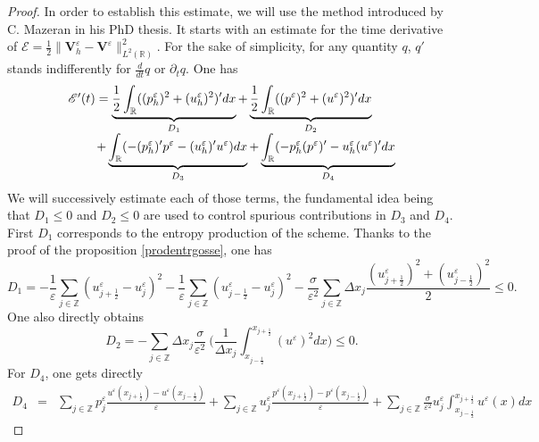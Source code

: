 \documentclass[a4paper,french,english,10pt]{article}
\newcommand\eps{\varepsilon}
\begin{document}
\begin{proof}
In order to establish this estimate, we will use the method introduced by C.
Mazeran \cite{Mazeran} in his PhD thesis.
It  starts with an estimate for the time derivative of
$\mathscr{E}=\frac12 \|\mathbf V_h^\eps - \mathbf V^\eps  \|^2_{L^2(\mathbb{R})}$.
For the sake of simplicity, for any quantity $q$,   $q'$ stands indifferently for  $\frac{d}{dt}q $ or $\partial_t q $. One has 
\begin{equation*}\label{esti}
\begin{array}{l}
\mathscr{E}'(t) = \underbrace{\frac12 
\int_{\mathbb{R}}((p_{h}^{\eps})^2+(u_{h}^{\eps})^2)'dx}_{D_1}+
\underbrace{\frac12 
\int_{\mathbb{R}}((p^{\eps})^2+(u^{\eps})^2)'dx}_{D_2} \\
\hspace{0.8cm}
+ \underbrace{\int_{\mathbb{R}}
(-(p_{h}^{\eps})'p^\eps-(u_{h}^{\eps})'u^\eps)dx}_{D_3} + \underbrace{\int_{\mathbb{R}}
(-p_{h}^{\eps}(p^{\eps})'-u_{h}^{\eps}(u^{\eps})'dx}_{D_4}
\end{array}
\end{equation*}
We will successively estimate each of those terms,
the fundamental idea being that
$D_1\leq 0$ and $D_2\leq 0$ are used to control 
spurious contributions in $D_3$ and $D_4$.
First $D_1$ corresponds to the
entropy production of the scheme. Thanks to the proof of
the proposition \ref{prodentrgosse},
one has
\begin{equation*}
 D_1 = -\frac{1}{\eps}\sum_{j\in \mathbb{Z}}
(u_{j+\frac12 }^{\eps}-u^{\eps}_j)^2 -\frac{1}{\eps} \sum_{j\in
\mathbb{Z}}(u_{j-\frac12 }^{\eps}-u^{\eps}_j)^2-
\frac{\sigma}{\eps^2}\sum_{j\in \mathbb{Z}} \Delta x_{j}
\frac{(u_{j+\frac12 }^{\eps})^2+(u_{j-\frac12 }^{\eps})^2}{2}\leq 0.
\end{equation*}
One also directly obtains
\begin{equation*}
 D_2 = -\sum_{j\in \mathbb{Z}} \Delta x_j \frac{ \sigma }{\eps^2} \: \bigg(
\frac{1}{\Delta x_j}{\int_{x_{j-\frac12}}^{x_{j+\frac12}}}(u^{\eps})^2 dx \bigg)
\leq 0.
\end{equation*}
For $D_4$, one gets  directly
\begin{eqnarray*}
 D_4 &=& \sum_{j\in \mathbb{Z}} p^{\eps}_j
\frac{u^{\eps}(x_{j+\frac12 })-u^{\eps}(x_{j-\frac12 })}{\eps} +
\sum_{j\in \mathbb{Z}} u^{\eps}_j 
\frac{p^{\eps}(x_{j+\frac12 })-p^{\eps}(x_{j-\frac12 })}{\eps} +
\sum_{j\in \mathbb{Z}} \frac{\sigma}{\eps^2} u^{\eps}_j 
{\int_{x_{j-\frac12}}^{x_{j+\frac12}}} u^{\eps}(x) dx 
\end{eqnarray*}

\end{proof}
\end{document}
